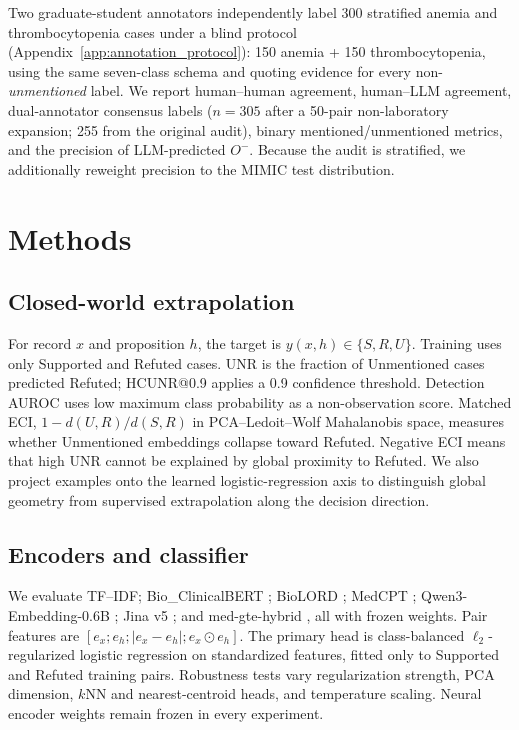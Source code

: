 \documentclass[11pt]{article}
\begin{document}
Two graduate-student annotators independently label 300 stratified anemia and
thrombocytopenia cases under a blind protocol (Appendix~\ref{app:annotation_protocol}):
150 anemia + 150 thrombocytopenia, using the same seven-class schema and quoting
evidence for every non-\emph{unmentioned} label. We report human--human
agreement, human--LLM agreement, dual-annotator consensus labels
($n=305$ after a 50-pair non-laboratory expansion; 255 from the original audit),
binary mentioned/unmentioned metrics, and the precision of LLM-predicted $O^-$.
Because the audit is stratified, we additionally reweight precision to the MIMIC
test distribution.

\section{Methods}
\subsection{Closed-world extrapolation}
For record $x$ and proposition $h$, the target is
$y(x,h)\in\{S,R,U\}$. Training uses only Supported and Refuted cases.
UNR is the fraction of Unmentioned cases predicted Refuted; HCUNR@0.9 applies a
0.9 confidence threshold. Detection AUROC uses low maximum class probability as
a non-observation score. Matched ECI, $1-d(U,R)/d(S,R)$ in PCA--Ledoit--Wolf Mahalanobis space,
measures whether Unmentioned embeddings collapse toward Refuted. Negative ECI
means that high UNR cannot be explained by global proximity to Refuted. We also
project examples onto the learned logistic-regression axis to distinguish
global geometry from supervised extrapolation along the decision direction.

\subsection{Encoders and classifier}
We evaluate TF--IDF; Bio\_ClinicalBERT
\citep{alsentzer-etal-2019-clinicalbert}; BioLORD
\citep{remy-etal-2022-biolord}; MedCPT \citep{jin-etal-2023-medcpt};
Qwen3-Embedding-0.6B \citep{zhang-etal-2025-qwen3embedding}; Jina v5
\citep{akram-etal-2026-jinav5}; and med-gte-hybrid
\citep{reimers-gurevych-2019-sentence,medaihs-2025-medgte}, all with frozen
weights. Pair features are
$[e_x;e_h;|e_x-e_h|;e_x\odot e_h]$. The primary head is class-balanced $\ell_2$-regularized logistic regression
on standardized features, fitted only to Supported and Refuted training pairs.
Robustness tests vary regularization strength, PCA dimension, $k$NN and
nearest-centroid heads, and temperature scaling. Neural encoder weights remain
frozen in every experiment.
\end{document}
